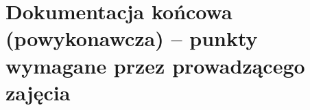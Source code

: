 \documentclass[10pt,a4paper]{article}
\begin{document}

\newpage
\section{Dokumentacja końcowa (powykonawcza) -- punkty wymagane przez prowadzącego zajęcia}

\end{document}
